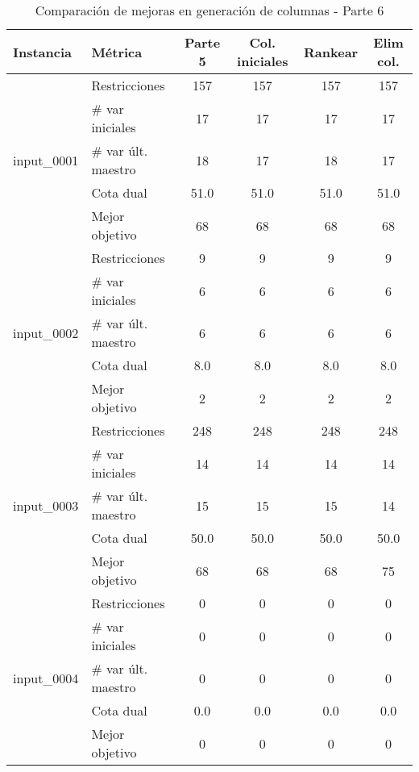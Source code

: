 \documentclass[a4paper,12pt]{article}
\begin{document}
\begin{table}[!ht]
\centering
\renewcommand{\arraystretch}{1.2}
\begin{tabular}{llcccc}
\toprule
\textbf{Instancia} & \textbf{Métrica} & \textbf{Parte 5} & \textbf{Col. iniciales} & \textbf{Rankear} & \textbf{Elim col.} \\
\midrule
\multirow{5}{*}{input\_0001} 
  & Restricciones         & 157 & 157 & 157 & 157 \\
  & \# var iniciales      & 17  & 17  & 17  & 17  \\
  & \# var últ. maestro   & 18  & 17  & 18  & 17  \\
  & Cota dual             & 51.0& 51.0& 51.0& 51.0 \\
  & Mejor objetivo        & 68  & 68  & 68  & 68  \\
\midrule
\multirow{5}{*}{input\_0002} 
  & Restricciones         & 9   & 9   & 9   & 9   \\
  & \# var iniciales      & 6   & 6   & 6   & 6   \\
  & \# var últ. maestro   & 6   & 6   & 6   & 6   \\
  & Cota dual             & 8.0 & 8.0 & 8.0 & 8.0 \\
  & Mejor objetivo        & 2   & 2   & 2   & 2   \\
\midrule
\multirow{5}{*}{input\_0003} 
  & Restricciones         & 248 & 248 & 248 & 248 \\
  & \# var iniciales      & 14  & 14  & 14  & 14  \\
  & \# var últ. maestro   & 15  & 15  & 15  & 14  \\
  & Cota dual             & 50.0& 50.0& 50.0& 50.0 \\
  & Mejor objetivo        & 68  & 68  & 68  & 75  \\
\midrule
\multirow{5}{*}{input\_0004} 
  & Restricciones         & 0   & 0   & 0   & 0   \\
  & \# var iniciales      & 0   & 0   & 0   & 0   \\
  & \# var últ. maestro   & 0   & 0   & 0   & 0   \\
  & Cota dual             & 0.0 & 0.0 & 0.0 & 0.0 \\
  & Mejor objetivo        & 0   & 0   & 0   & 0   \\
\bottomrule
\end{tabular}
\caption{Comparación de mejoras en generación de columnas - Parte 6}
\end{table}
\end{document}
